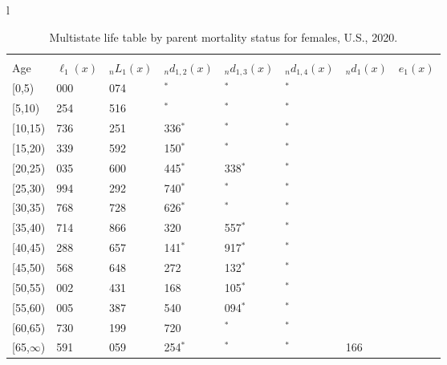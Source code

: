 \documentclass[
]{article}
\begin{document}
\begin{table}
\caption{\label{tab:table-female}Multistate life table by parent mortality status for females, U.S., 2020.}

\centering
\fontsize{9}{11}\selectfont
\begin{tabular}[t]{l}
\hline
\begin{tabular}{>{\raggedright\arraybackslash}p{.45in}>{\raggedleft\arraybackslash}p{.65in}>{\raggedleft\arraybackslash}p{.65in}>{\raggedleft\arraybackslash}p{.65in}>{\raggedleft\arraybackslash}p{.65in}>{\raggedleft\arraybackslash}p{.65in}>{\raggedleft\arraybackslash}p{.65in}>{\raggedleft\arraybackslash}p{.65in}}
\toprule
\multicolumn{1}{c}{ } & \multicolumn{7}{c}{(1) Lost neither} \\
\cmidrule(l{3pt}r{3pt}){2-8}
Age & $\ell_{1}(x)$ & ${}_nL_{1}(x)$ & ${}_nd_{1,2}(x)$ & ${}_nd_{1,3}(x)$ & ${}_nd_{1,4}(x)$ & ${}_nd_{1}(x)$ & $e_{1}(x)$\\
\midrule
{}[0,5) & 100 000 & 495 074 & 178$^{*}$ & 0$^{*}$ & 0$^{*}$ & 568 & 46\\
{}[5,10) & 99 254 & 490 516 & 470$^{*}$ & 0$^{*}$ & 0$^{*}$ & 48 & 41\\
{}[10,15) & 98 736 & 482 251 & 1 336$^{*}$ & 0$^{*}$ & 0$^{*}$ & 61 & 36\\
{}[15,20) & 97 339 & 474 592 & 1 150$^{*}$ & 0$^{*}$ & 0$^{*}$ & 154 & 31\\
{}[20,25) & 96 035 & 456 600 & 1 445$^{*}$ & 1 338$^{*}$ & 0$^{*}$ & 259 & 26\\
\addlinespace
{}[25,30) & 92 994 & 440 292 & 1 740$^{*}$ & 132$^{*}$ & 0$^{*}$ & 354 & 22\\
{}[30,35) & 90 768 & 407 728 & 3 626$^{*}$ & 975$^{*}$ & 0$^{*}$ & 453 & 17\\
{}[35,40) & 85 714 & 372 866 & 4 320 & 1 557$^{*}$ & 0$^{*}$ & 549 & 13\\
{}[40,45) & 79 288 & 337 657 & 3 141$^{*}$ & 1 917$^{*}$ & 0$^{*}$ & 662 & 10\\
{}[45,50) & 73 568 & 266 648 & 7 272 & 3 132$^{*}$ & 415$^{*}$ & 746 & 6\\
\addlinespace
{}[50,55) & 62 002 & 174 431 & 7 168 & 1 105$^{*}$ & 0$^{*}$ & 723 & 3\\
{}[55,60) & 53 005 & 102 387 & 6 540 & 2 094$^{*}$ & 0$^{*}$ & 641 & 2\\
{}[60,65) & 43 730 & 31 199 & 2 720 & 694$^{*}$ & 437$^{*}$ & 288 & 1\\
{}[65,$\infty$) & 39 591 & 23 059 & 1 254$^{*}$ & 975$^{*}$ & 564$^{*}$ & 1 166 & 0\\

\end{tabular}
\end{tabular}
\end{table}
\end{document}
